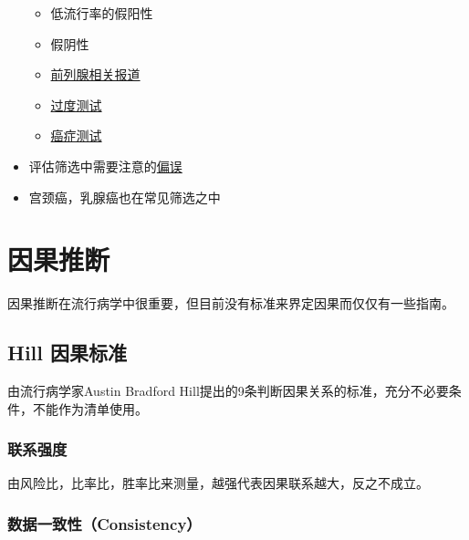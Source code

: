 \documentclass[
]{book}
\providecommand{\tightlist}{%
  \setlength{\itemsep}{0pt}\setlength{\parskip}{0pt}}
\begin{document}
\begin{itemize}
  \begin{itemize}
  \tightlist
  \item
    低流行率的假阳性
  \item
    假阴性
  \item
    \href{http://well.blogs.nytimes.com/2012/04/24/older-men-still-being-screened-for-prostate-cancer}{前列腺相关报道}
  \item
    \href{http://www.vaoutcomes.org/papers/Welch_NYTimes_1.pdf}{过度测试}
  \item
    \href{http://well.blogs.nytimes.com/2013/07/29/report-suggests-sweeping-changes-to-cancer-detection-and-treatment}{癌症测试}
  \end{itemize}
\item
  评估筛选中需要注意的\href{http://www.vaoutcomes.org/downloads/Lead_Time_Bias.pdf}{偏误}
\item
  宫颈癌，乳腺癌也在常见筛选之中
\end{itemize}

\hypertarget{ux56e0ux679cux63a8ux65ad}{%
\section{因果推断}\label{ux56e0ux679cux63a8ux65ad}}

因果推断在流行病学中很重要，但目前没有标准来界定因果而仅仅有一些指南。

\hypertarget{hill-ux56e0ux679cux6807ux51c6}{%
\subsection{Hill 因果标准}\label{hill-ux56e0ux679cux6807ux51c6}}

由流行病学家Austin Bradford Hill提出的9条判断因果关系的标准，充分不必要条件，不能作为清单使用。

\hypertarget{ux8054ux7cfbux5f3aux5ea6}{%
\subsubsection{联系强度}\label{ux8054ux7cfbux5f3aux5ea6}}

由风险比，比率比，胜率比来测量，越强代表因果联系越大，反之不成立。

\hypertarget{ux6570ux636eux4e00ux81f4ux6027consistency}{%
\subsubsection{数据一致性（Consistency）}\label{ux6570ux636eux4e00ux81f4ux6027consistency}}
\end{document}
